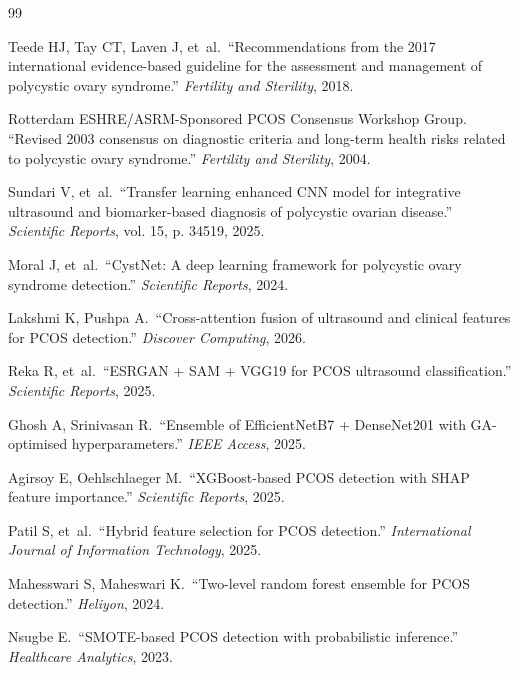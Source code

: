 \documentclass[11pt,twocolumn]{article}
\newcommand{\PCOS}{PCOS}
\begin{document}

\begin{thebibliography}{99}
\small

Teede HJ, Tay CT, Laven J, et~al.\ ``Recommendations from the 2017
international evidence-based guideline for the assessment and management
of polycystic ovary syndrome.'' \emph{Fertility and Sterility}, 2018.

Rotterdam ESHRE/ASRM-Sponsored PCOS Consensus Workshop Group.
``Revised 2003 consensus on diagnostic criteria and long-term health
risks related to polycystic ovary syndrome.'' \emph{Fertility and
Sterility}, 2004.

Sundari V, et~al.\ ``Transfer learning enhanced CNN model for
integrative ultrasound and biomarker-based diagnosis of polycystic
ovarian disease.'' \emph{Scientific Reports}, vol. 15, p. 34519, 2025.

Moral J, et~al.\ ``CystNet: A deep learning framework for polycystic
ovary syndrome detection.'' \emph{Scientific Reports}, 2024.

Lakshmi K, Pushpa A.\ ``Cross-attention fusion of ultrasound and
clinical features for \PCOS{} detection.'' \emph{Discover Computing},
2026.

Reka R, et~al.\ ``ESRGAN + SAM + VGG19 for \PCOS{} ultrasound
classification.'' \emph{Scientific Reports}, 2025.

Ghosh A, Srinivasan R.\ ``Ensemble of EfficientNetB7 + DenseNet201 with
GA-optimised hyperparameters.'' \emph{IEEE Access}, 2025.

Agirsoy E, Oehlschlaeger M.\ ``XGBoost-based \PCOS{} detection with SHAP
feature importance.'' \emph{Scientific Reports}, 2025.

Patil S, et~al.\ ``Hybrid feature selection for \PCOS{} detection.''
\emph{International Journal of Information Technology}, 2025.

Mahesswari S, Maheswari K.\ ``Two-level random forest ensemble for
\PCOS{} detection.'' \emph{Heliyon}, 2024.

Nsugbe E.\ ``SMOTE-based \PCOS{} detection with probabilistic
inference.'' \emph{Healthcare Analytics}, 2023.


\end{thebibliography}
\end{document}
